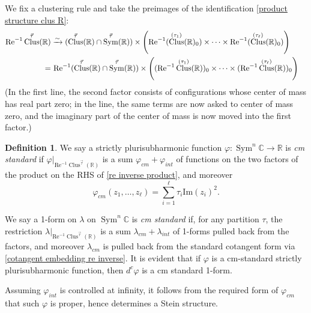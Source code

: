 \documentclass{article}
\def\R{\mathbb{R}}
\def\C{\mathbb{C}}
\DeclareMathOperator{\Sym}{Sym}
\DeclareMathOperator{\Clus}{Clus}
\renewcommand{\Re}{\mathrm{Re}}
\theoremstyle{definition}
\newtheorem{definition}
[theorem]{Definition}
\begin{document}
We fix a clustering rule and take the preimages of the identification  \eqref{product structure clus R}: 
\begin{align} \notag \Re^{-1}\Clus^{\vec{\tau}}(\R)  & \xrightarrow{\sim}   (\Clus^{\vec{\tau}}(\R) \cap \Sym^{\vec{\tau}}(\R) ) \times \left( \Re^{-1} (\Clus^{(\tau_1)}(\R)_0) \times \cdots \times \Re^{-1} (\Clus^{(\tau_\ell)}(\R)_0) \right) \\
\label{re inverse product}
 = & \,\, \Re^{-1}(\Clus^{\vec{\tau}}(\R) \cap \Sym^{\vec{\tau}}(\R) ) \times \left( (\Re^{-1} \Clus^{(\tau_1)}(\R))_0 \times \cdots \times (\Re^{-1} \Clus^{(\tau_\ell)}(\R))_0 \right) &
\end{align}
(In the first line, the second factor consists of configurations whose center of mass has real part zero; in the line, the same terms are now asked to center of mass zero, and the imaginary part of the center of mass is now moved into the first factor.)




\begin{definition} \label{cm standard 1-form}
    We say a strictly plurisubharmonic function $\varphi: \Sym^n \C \to \R$ is {\em cm standard} if $\varphi|_{\Re^{-1}\Clus^{\vec{\tau}}(\R)}$ is a sum $\varphi_{cm} + \varphi_{int}$ %
    of functions on the two factors of the product on the RHS of \eqref{re inverse product}, and moreover $$\varphi_{cm}(z_1, \ldots, z_\ell) = \sum_{i = 1}^\ell \tau_i \mathrm{Im}(z_i)^2.$$

    We say a 1-form on $\lambda$ on $\Sym^n \C$ is {\em cm standard} if, for any partition $\tau$, the restriction $\lambda|_{\Re^{-1}\Clus^{\vec{\tau}}(\R)}$ is a sum $\lambda_{cm} + \lambda_{int}$ of 1-forms pulled back from the  factors, and moreover $\lambda_{cm}$ is pulled back from the standard cotangent form via \eqref{cotangent embedding re inverse}.
    It is evident that if $\varphi$ is a cm-standard   strictly plurisubharmonic function, then $d^c \varphi$ is a cm standard 1-form. 
\end{definition}


Assuming $\varphi_{int}$ is controlled at infinity, 
it follows from the required form of $\varphi_{cm}$ that such $\varphi$ is proper, hence determines a Stein structure.
\end{document}
